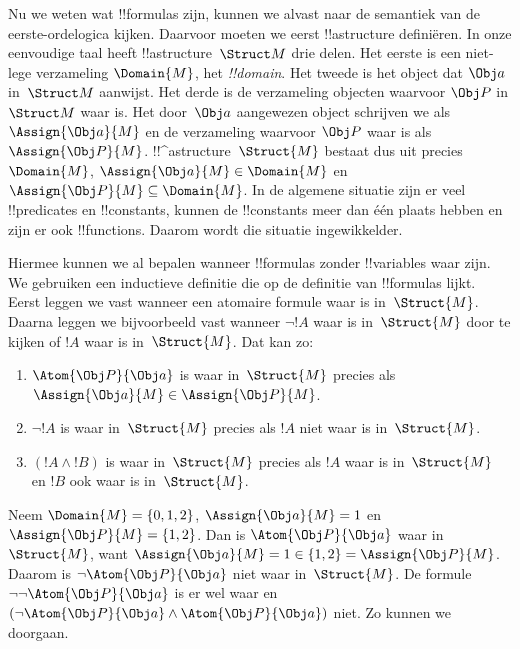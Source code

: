 \documentclass[openany]{memoir}
\begin{document}


Nu we weten wat !!{formula}s zijn, kunnen we alvast naar de semantiek
van de eerste-ordelogica kijken. Daarvoor moeten we eerst !!a{structure}
definiëren. In onze eenvoudige taal heeft !!a{structure}~$\Struct M$
drie delen. Het eerste is een niet-lege verzameling $\Domain{M}$, het
\emph{!!{domain}}. Het tweede is het object dat $\Obj a$ in~$\Struct M$
aanwijst. Het derde is de verzameling objecten waarvoor $\Obj P$ in
$\Struct M$ waar is. Het door~$\Obj a$ aangewezen object schrijven we
als $\Assign{\Obj a}{M}$ en de verzameling waarvoor $\Obj P$ waar is
als $\Assign{\Obj P}{M}$. !!^a{structure}~$\Struct{M}$ bestaat dus uit
precies $\Domain{M}$, $\Assign{\Obj a}{M} \in \Domain{M}$ en
$\Assign{\Obj P}{M} \subseteq \Domain{M}$. In de algemene situatie
zijn er veel !!{predicate}s en !!{constant}s, kunnen de !!{constant}s
meer dan één plaats hebben en zijn er ook !!{function}s. Daarom wordt
die situatie ingewikkelder.

Hiermee kunnen we al bepalen wanneer !!{formula}s zonder
!!{variable}s waar zijn. We gebruiken een inductieve definitie die op
de definitie van !!{formula}s lijkt. Eerst leggen we vast wanneer een
atomaire formule waar is in~$\Struct{M}$. Daarna leggen we bijvoorbeeld
vast wanneer $\lnot !A$ waar is in~$\Struct{M}$ door te kijken of $!A$
waar is in~$\Struct{M}$. Dat kan zo:
\begin{enumerate}
  \item $\Atom{\Obj P}{\Obj a}$ is waar in~$\Struct{M}$ precies als
  $\Assign{\Obj a}{M} \in \Assign{\Obj P}{M}$.
  \item $\lnot !A$ is waar in~$\Struct{M}$ precies als $!A$ niet waar
  is in~$\Struct{M}$.
  \item $(!A \land !B)$ is waar in~$\Struct{M}$ precies als $!A$ waar
  is in~$\Struct{M}$ en $!B$ ook waar is in~$\Struct{M}$.
\end{enumerate}
Neem $\Domain{M} = \{0, 1, 2\}$, $\Assign{\Obj a}{M} = 1$ en
$\Assign{\Obj P}{M} = \{1, 2\}$. Dan is
$\Atom{\Obj P}{\Obj a}$ waar in~$\Struct{M}$, want
$\Assign{\Obj a}{M} =  1 \in \{1,2\} = \Assign{\Obj P}{M}$. Daarom is
$\lnot \Atom{\Obj P}{\Obj a}$ niet waar in~$\Struct{M}$. De formule
$\lnot\lnot \Atom{\Obj P}{\Obj a}$ is er wel waar en
$(\lnot \Atom{\Obj P}{\Obj a} \land \Atom{\Obj P}{\Obj a})$ niet.
Zo kunnen we doorgaan.
\end{document}
